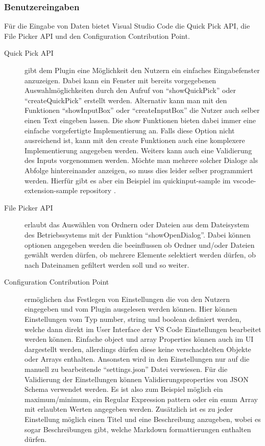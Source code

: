 \subsubsection{Benutzereingaben}
  Für die Eingabe von Daten bietet Visual Studio Code die Quick Pick API, die File Picker API
  und den Configuration Contribution Point.
  \begin{description}
    \item[Quick Pick API] gibt dem Plugin eine Möglichkeit den Nutzern ein einfaches Eingabefenster
      anzuzeigen. Dabei kann ein Fenster mit bereits vorgegebenen Auswahlmöglichkeiten durch
      den Aufruf von \enquote{showQuickPick} oder \enquote{createQuickPick} erstellt werden.
      Alternativ kann man mit den Funktionen \enquote{showInputBox} oder \enquote{createInputBox}
      die Nutzer auch selber einen Text eingeben lassen. Die show Funktionen bieten dabei immer
      eine einfache vorgefertigte Implementierung an. Falls diese Option nicht ausreichend ist,
      kann mit den create Funktionen auch eine komplexere Implementierung angegeben werden.
      Weiters kann auch eine Validierung des Inputs vorgenommen werden.
      Möchte man mehrere solcher Dialoge als Abfolge hintereinander anzeigen, so muss dies leider
      selber programmiert werden. Hierfür gibt es aber ein Beispiel im quickinput-sample
      im vscode-extension-sample repository \cite{VSCodeExtensionSamples}. 
    \item[File Picker API] erlaubt das Auswählen von Ordnern oder Dateien aus dem Dateisystem
      des Betriebssystems mit der Funktion \enquote{showOpenDialog}. Dabei können optionen angegeben
      werden die beeinflussen ob Ordner und/oder Dateien gewählt werden dürfen, ob mehrere Elemente
      selektiert werden dürfen, ob nach Dateinamen gefiltert werden soll und so weiter.
    \item[Configuration Contribution Point] ermöglichen das Festlegen von Einstellungen
      die von den Nutzern eingegeben und vom Plugin ausgelesen werden können. Hier können
      Einstellungen vom Typ number, string und boolean definiert werden, welche dann direkt
      im User Interface der VS Code Einstellungen bearbeitet werden können.
      Einfache object und array Properties können auch im UI dargestellt werden,
      allerdings dürfen diese keine verschachtelten Objekte oder Arrays enthalten.
      Ansonsten wird in den Einstellungen nur auf die manuell zu bearbeitende 
      \enquote{settings.json} Datei verwiesen.
      Für die Validierung der Einstellungen können Validierungsproperties
      von JSON Schema verwendet werden. Es ist also zum Beispiel möglich
      ein maximum/minimum, ein Regular Expression pattern oder ein enum Array
      mit erlaubten Werten angegeben werden.
      Zusätzlich ist es zu jeder Einstellung möglich einen Titel und eine Beschreibung
      anzugeben, wobei es sogar Beschreibungen gibt, welche Markdown formattierungen
      enthalten dürfen.
  \end{description}
